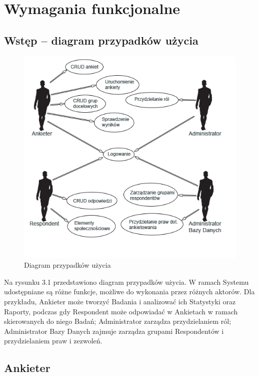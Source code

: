 \chapter{Wymagania funkcjonalne}
\label{Chapter3}

\section{Wstęp -- diagram przypadków użycia}

\begin{figure}[th]
\centering\includegraphics[width=15cm]{figures/UseCaseView}
\caption{Diagram przypadków użycia}\label{rys:usecase}
\end{figure}

Na rysunku 3.1 przedstawiono diagram przypadków użycia. W ramach Systemu udostępniane są różne funkcje, możliwe do wykonania przez różnych aktorów. Dla przykładu, Ankieter może tworzyć Badania i analizować ich Statystyki oraz Raporty, podczas gdy Respondent może odpowiadać w Ankietach w ramach skierowanych do niego Badań; Administrator zarządza przydzielaniem ról; Administrator Bazy Danych zajmuje zarządza grupami Respondentów i przydzielaniem praw i zezwoleń.

\section{Ankieter}

